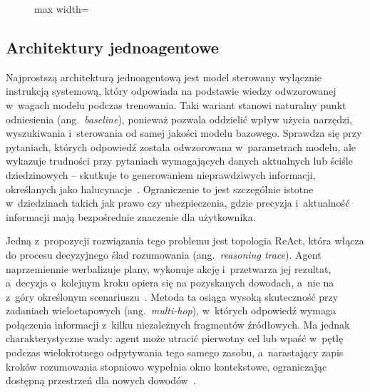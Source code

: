 \begin{figure}[H]
\begin{adjustbox}{max width=\textwidth}
  \end{adjustbox}
\end{figure}

\subsection{Architektury jednoagentowe}\label{subsec:architektury-jednoagentowe}

Najprostszą architekturą jednoagentową jest model sterowany wyłącznie
instrukcją systemową, który odpowiada na podstawie wiedzy odwzorowanej w~wagach
modelu podczas trenowania. Taki wariant stanowi naturalny punkt odniesienia
(ang.~\textit{baseline}), ponieważ pozwala oddzielić wpływ użycia narzędzi,
wyszukiwania i~sterowania od samej jakości modelu bazowego. Sprawdza się przy
pytaniach, których odpowiedź została odwzorowana w~parametrach modelu, ale
wykazuje trudności przy pytaniach wymagających danych aktualnych lub ściśle
dziedzinowych -- skutkuje to generowaniem nieprawdziwych informacji,
określanych jako halucynacje~\cite{ji2023survey}. Ograniczenie to jest
szczególnie istotne w~dziedzinach takich jak prawo czy ubezpieczenia, gdzie
precyzja i~aktualność informacji mają bezpośrednie znaczenie dla użytkownika.

Jedną z~propozycji rozwiązania tego problemu jest topologia ReAct, która włącza
do procesu decyzyjnego ślad rozumowania (ang.~\textit{reasoning trace}). Agent
naprzemiennie werbalizuje plany, wykonuje akcję i~przetwarza jej rezultat,
a~decyzja o~kolejnym kroku opiera się na pozyskanych dowodach, a~nie na z~góry
określonym scenariuszu~\cite{yao2022react}. Metoda ta osiąga wysoką skuteczność
przy zadaniach wieloetapowych (ang.~\textit{multi-hop}), w~których odpowiedź
wymaga połączenia informacji z~kilku niezależnych fragmentów źródłowych. Ma
jednak charakterystyczne wady: agent może utracić pierwotny cel lub wpaść
w~pętlę podczas wielokrotnego odpytywania tego samego zasobu, a~narastający
zapis kroków rozumowania stopniowo wypełnia okno kontekstowe, ograniczając
dostępną przestrzeń dla nowych dowodów~\cite{yao2022react, wang2024survey}.

